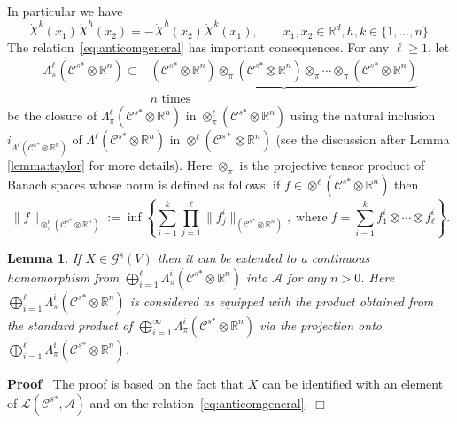 \documentclass{article}
\newcommand{\assign}{:=}
\newcommand{\asterisk}{\mathord{*}}
\newcommand{\tmop}[1]{\ensuremath{\operatorname{#1}}}
\newenvironment{proof}{\noindent\textbf{Proof\ }}{\hspace*{\fill}$\Box$\medskip}
\newtheorem{lemma}[theorem]{Lemma}
\begin{document}
In particular we have
\[ \dot{X}^k (x_1) \dot{X}^h (x_2) = - \dot{X}^h (x_2) \dot{X}^k (x_1), \qquad
   x_1, x_2 \in \mathbb{R}^d, h, k \in \{ 1, \ldots, n \} . \]
The relation~{\eqref{eq:anticomgeneral}} has important consequences. For any
$\ell \geqslant 1$, let
\[ \begin{array}{cc}
     \Lambda^{\ell}_{\pi} (\mathcal{C}^{s \asterisk} \otimes \mathbb{R}^n)
     \subset & \underbrace{(\mathcal{C}^{s \asterisk} \otimes \mathbb{R}^n)
     \otimes_{\pi} (\mathcal{C}^{s \asterisk} \otimes \mathbb{R}^n)
     \otimes_{\pi} \cdots \otimes_{\pi} (\mathcal{C}^{s \asterisk} \otimes
     \mathbb{R}^n)}\\
     & \text{$n$ times}
   \end{array} \]
be the closure of $\Lambda^{\ell}_{\pi} (\mathcal{C}^{s \asterisk} \otimes
\mathbb{R}^n)$ in $\otimes^{\ell}_{\pi} (\mathcal{C}^{s \asterisk} \otimes
\mathbb{R}^n)$ using the natural inclusion $i_{\Lambda^{\ell} (\mathcal{C}^{s
\asterisk} \otimes \mathbb{R}^n)}$ of $\Lambda^{\ell} (\mathcal{C}^{s
\asterisk} \otimes \mathbb{R}^n)$ in $\otimes^{\ell} (\mathcal{C}^{s \ast}
\otimes \mathbb{R}^n)$ (see the discussion after Lemma \ref{lemma:taylor} for
more details). Here $\otimes_{\pi}$ is the projective tensor product of Banach
spaces whose norm is defined as follows: if $f \in \otimes^{\ell}
(\mathcal{C}^{s \asterisk} \otimes \mathbb{R}^n)$ then
\[ \| f \|_{\otimes^{\ell}_{\pi} (\mathcal{C}^{s \asterisk} \otimes
   \mathbb{R}^n)} \assign \inf \left\{ \sum_{i = 1}^k \prod_{j = 1}^{\ell} \|
   f^i_j \|_{(\mathcal{C}^{s \asterisk} \otimes \mathbb{R}^n)}, \tmop{where} f
   = \sum_{i = 1}^k f^i_1 \otimes \cdots \otimes f^i_{\ell} \right\} . \]
\begin{lemma}
  \label{remark_regularity}If $X \in \mathcal{G}^s (V)$ then it can be
  extended to a continuous homomorphism from $\bigoplus_{i = 1}^{\ell}
  \Lambda_{\pi}^i (\mathcal{C}^{s \asterisk} \otimes \mathbb{R}^n)$ into
  $\mathcal{A}$ for any $n > 0$. Here $\bigoplus_{i = 1}^{\ell}
  \Lambda_{\pi}^i (\mathcal{C}^{s \asterisk} \otimes \mathbb{R}^n)$ is
  considered as equipped with the product obtained from the standard product
  of $\bigoplus_{i = 1}^{\infty} \Lambda_{\pi}^i (\mathcal{C}^{s \asterisk}
  \otimes \mathbb{R}^n)$ via the projection onto $\bigoplus_{i = 1}^{\ell}
  \Lambda_{\pi}^i (\mathcal{C}^{s \asterisk} \otimes \mathbb{R}^n)$.
\end{lemma}

\begin{proof}
  The proof is based on the fact that $X$ can be identified with an element of
  $\mathcal{L} (\mathcal{C}^{s \asterisk}, \mathcal{A})$ and on the
  relation~{\eqref{eq:anticomgeneral}}.
\end{proof}
\end{document}
